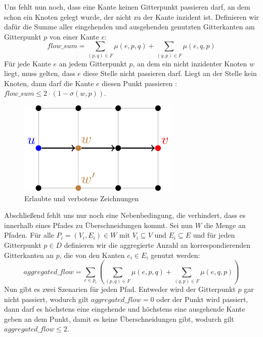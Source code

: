 \documentclass[bachelor, german]{algothesis}
\begin{document}
Uns fehlt nun noch, dass eine Kante keinen Gitterpunkt passieren darf, an dem schon ein Knoten gelegt wurde, der nicht zu der Kante inzident ist. Definieren wir dafür die Summe aller eingehenden und ausgehenden genutzten Gitterkanten am Gitterpunkt $p$ von einer Kante $e$: $$flow\_sum = \sum_{(p,q) \in F} \mu(e,p,q) + \sum_{(q,p) \in F} \mu(e,q,p)$$
Für jede Kante $e$ an jedem Gitterpunkt $p$, an dem ein nicht inzidenter Knoten $w$ liegt, muss gelten, dass $e$ diese Stelle nicht passieren darf. Liegt an der Stelle kein Knoten, dann darf die Kante $e$ diesen Punkt passieren : $flow\_sum \leq 2 \cdot (1 - \sigma(w,p))$. \newline
\begin{figure}[H]
    \centering
    \includegraphics{figures/OverNodePoint.png}
    \caption{Erlaubte und verbotene Zeichnungen}
    \label{fig:OverNodePoint}
\end{figure}
Abschließend fehlt uns nur noch eine Nebenbedingung, die verhindert, dass es innerhalb eines Pfades zu Überschneidungen kommt. Sei nun $W$ die Menge an Pfaden. Für alle $P_i =(V_i, E_i) \in W$  mit $V_i\subseteq V$ und  $E_i \subseteq E$ und für jeden Gitterpunkt $p \in D$ definieren wir die aggregierte Anzahl an korrespondierenden Gitterkanten an $p$, die von den Kanten $e_i \in E_i$ genutzt werden: $$aggregated\_flow = \sum_{e \in p_i}(\sum_{(p,q) \in F} \mu(e,p,q) + \sum_{(q,p) \in F} \mu(e,q,p))$$  Nun gibt es zwei Szenarien für jeden Pfad. Entweder wird der Gitterpunkt $p$ gar nicht passiert, wodurch gilt $aggregated\_flow = 0$ oder der Punkt wird passiert, dann darf es höchstens eine eingehende und höchstens eine ausgehende Kante geben an dem Punkt, damit es keine Überschneidungen gibt, wodurch gilt $aggregated\_flow \leq 2$.\newline 
\end{document}
